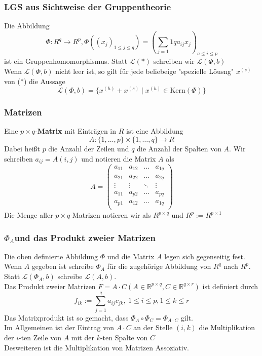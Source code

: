 \documentclass{kit}
\begin{document}
    \subsubsection{LGS aus Sichtweise der Gruppentheorie}
      Die Abbildung
      $$\Phi:R^q\longrightarrow R^p,\Phi((x_j)_{1\le j\le q})=(\sum_{j=1}1qa_{ij}x_j)_{a\le i\le p}$$
      ist ein Gruppenhomomorphismus. Statt $\mathcal{L}(*)$ schreiben wir $\mathcal{L}(\Phi,b)$\\
      Wenn $\mathcal{L}(\Phi,b)$ nicht leer ist, so gilt für jede beliebeige "spezielle Löusng" $x^{(s)}$ von (*) die Aussage
      $$\mathcal{L}(\Phi,b)=\{x^{(h)}+x^{(s)}\mid x^{(h)}\in \text{Kern}(\Phi)\}$$
    \subsubsection{Matrizen}
      Eine $p\times q$-\textbf{Matrix} mit Einträgen in $R$ ist eine Abbildung
      $$A:\{1,\dots,p\}\times\{1,\dots,q\}\longrightarrow R$$
      Dabei heißt $p$ die Anzahl der Zeilen und $q$ die Anzahl der Spalten von $A$. Wir schreiben $a_{ij}=A(i,j)$ und notieren die Matrix $A$ als
      $$A=\begin{pmatrix}
        a_{11} & a_{12} & \dots & a_{1q}\\
        a_{21} & a_{22} & \dots & a_{2q}\\
        \vdots & \vdots & \ddots & \vdots\\
        a_{11} & a_{p2} & \dots & a_{pq}\\
        a_{p1} & a_{12} & \dots & a_{1q}\\
      \end{pmatrix}$$
      Die Menge aller $p\times q$-Matrizen notieren wir als $R^{p\times q}$ und $R^p:=R^{p\times1}$
    \subsubsection{\texorpdfstring{$\Phi_A$}\ und das Produkt zweier Matrizen}
      Die oben definierte Abbildung $\Phi$ und die Matrix $A$ legen sich gegenseitig fest. Wenn $A$ gegeben ist schreibe $\Phi_A$ für die zugehörige Abbildung von $R^q$ nach $R^p$. Statt $\mathcal{L}(\Phi_A,b)$ schreibe $\mathcal{L}(A,b)$.\\
      Das Produkt zweier Matrizen $F=A\cdot C(A\in \mathbb{R}^{p\times q},C\in \mathbb{R}^{q\times r})$ ist definiert durch
      $$f_{ik}:=\sum_{j=1}^qa_{ij}c_{jk},\ 1\le i\le p, 1\le k\le r$$
      Das Matrixprodukt ist so gemacht, dass $\Phi_A\circ\Phi_C=\Phi_{A\cdot C}$ gilt.\\
      Im Allgemeinen ist der Eintrag von $A\cdot C$ an der Stelle $(i,k)$ die Multiplikation der $i$-ten Zeile von $A$ mit der $k$-ten Spalte von $C$\\
      Desweiteren ist die Multiplikation von Matrizen Assoziativ.
\end{document}

